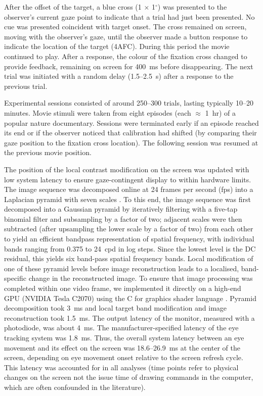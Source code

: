 \documentclass[11pt,a4paper]{article}
\begin{document}
After the offset of the target, a blue cross (1 $\times$ 1$^\circ$) was presented to the observer's current gaze point to indicate that a trial had just been presented.
No cue was presented coincident with target onset.
The cross remained on screen, moving with the observer's gaze, until the observer made a button response to indicate the location of the target (4AFC).
During this period the movie continued to play.
After a response, the colour of the fixation cross changed to provide feedback, remaining on screen for 400~ms before disappearing.
The next trial was initiated with a random delay (1.5--2.5~s) after a response to the previous trial.

Experimental sessions consisted of around 250--300 trials, lasting typically 10--20 minutes.
Movie stimuli were taken from eight episodes (each $\approx$ 1~hr) of a popular nature documentary.
Sessions were terminated early if an episode reached its end or if the observer noticed that calibration had shifted (by comparing their gaze position to the fixation cross location).
The following session was resumed at the previous movie position.

The position of the local contrast modification on the screen was updated with low system latency to ensure gaze-contingent display to within hardware limits.
The image sequence was decomposed online at 24 frames per second (fps) into a Laplacian pyramid with seven scales \citep{Adelson1981}. To this end, the image
sequence was first decomposed into a Gaussian pyramid by iteratively filtering with a five-tap binomial filter and subsampling by a factor of two; adjacent
scales were then subtracted (after upsampling the lower scale by a factor of
two) from each other to yield an efficient bandpass representation of spatial
frequency, with individual bands ranging from 0.375 to 24~cpd in log steps.
Since the lowest level is the DC residual, this yields six band-pass spatial frequency bands. 
Local modification of one of these pyramid levels before image reconstruction leads to a localised, band-specific change in the reconstructed image.
To ensure that image processing was completed within one video frame, we implemented it directly on a high-end GPU (NVIDIA Tesla C2070) using the C for graphics shader language \citep{Mark2003}.
Pyramid decomposition took 3~ms and local target band modification and image reconstruction took 1.5~ms.
The output latency of the monitor, measured with a photodiode, was about 4~ms.
The manufacturer-specified latency of the eye tracking system was 1.8~ms.
Thus, the overall system latency between an eye movement and its effect on the screen was 18.6--26.9~ms at the center of the screen, depending on eye movement onset relative to the screen refresh cycle.
This latency was accounted for in all analyses (time points refer to physical changes on the screen not the issue time of drawing commands in the computer, which are often confounded in the literature).
\end{document}
